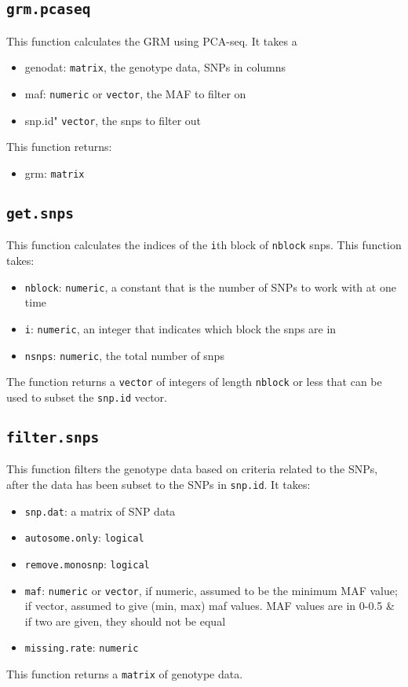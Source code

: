 \documentclass[11pt]{article}
\begin{document}
\subsection{\texttt{grm.pcaseq}}
This function calculates the GRM using PCA-seq. It takes a 
\begin{itemize}
	\item genodat: \texttt{matrix}, the genotype data, SNPs in columns
	\item maf: \texttt{numeric} or \texttt{vector}, the MAF to filter on
	\item snp.id" \texttt{vector}, the snps to filter out
\end{itemize}
This function returns:
\begin{itemize}
	\item grm: \texttt{matrix}
\end{itemize}

\subsection{\texttt{get.snps}}
This function calculates the indices of the \texttt{i}th block of \texttt{nblock} snps. This function takes:
\begin{itemize}
	\item \texttt{nblock}: \texttt{numeric}, a constant that is the number of SNPs to work with at one time
	\item \texttt{i}: \texttt{numeric}, an integer that indicates which block the snps are in
	\item \texttt{nsnps}: \texttt{numeric}, the total number of snps
\end{itemize}

The function returns a \texttt{vector} of integers of length \texttt{nblock} or less that can be used to subset the \texttt{snp.id} vector.
\subsection{\texttt{filter.snps}}
This function filters the genotype data based on criteria related to the SNPs, after the data has been subset to the SNPs in \texttt{snp.id}. It takes:
\begin{itemize}
	\item \texttt{snp.dat}: a matrix of SNP data
	\item \texttt{autosome.only}: \texttt{logical}
	\item \texttt{remove.monosnp}: \texttt{logical}
	\item \texttt{maf}: \texttt{numeric} or \texttt{vector}, if numeric, assumed to be the minimum MAF value; if vector, assumed to give (min, max) maf values. MAF values are in 0-0.5 \& if two are given, they should not be equal
\item \texttt{missing.rate}: \texttt{numeric}
\end{itemize}
This function returns a \texttt{matrix} of genotype data.
\end{document}
